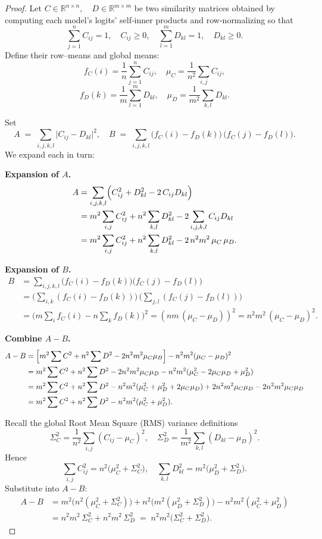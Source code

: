 \documentclass{article}
\begin{document}
\begin{proof}
Let 
$C\in\mathbb{R}^{n\times n},\quad D\in\mathbb{R}^{m\times m}$
be two similarity matrices obtained by computing each model’s logits’ self‐inner products and row‐normalizing so that
\[
\sum_{j=1}^n C_{ij}=1,\quad C_{ij}\ge0,
\quad
\sum_{l=1}^m D_{kl}=1,\quad D_{kl}\ge0.
\]
Define their row–means and global means:
\[
f_C(i)=\frac1n\sum_{j=1}^nC_{ij},\quad
\mu_C=\frac1{n^2}\sum_{i,j}C_{ij},
\]
\[
f_D(k)=\frac1m\sum_{l=1}^mD_{kl},\quad
\mu_D=\frac1{m^2}\sum_{k,l}D_{kl}.
\]

Set
\[
A \;=\;\sum_{i,j,k,l}\bigl|C_{ij}-D_{kl}\bigr|^2,
\quad
B \;=\;\sum_{i,j,k,l}\bigl(f_C(i)-f_D(k)\bigr)\,\bigl(f_C(j)-f_D(l)\bigr).
\]
We expand each in turn:

\textbf{Expansion of \(A\).}
\[
\begin{aligned}
A
&=\sum_{i,j,k,l}\Bigl(C_{ij}^2 + D_{kl}^2 -2\,C_{ij}D_{kl}\Bigr)\\
&=m^2\sum_{i,j}C_{ij}^2
+ n^2\sum_{k,l}D_{kl}^2
-2\sum_{i,j,k,l}C_{ij}D_{kl}\\
&=m^2\sum_{i,j}C_{ij}^2
+ n^2\sum_{k,l}D_{kl}^2
-2\,n^2m^2\,\mu_C\,\mu_D.
\end{aligned}
\]

\textbf{Expansion of \(B\).}
\[
\begin{aligned}
B
&=\sum_{i,j,k,l}\bigl(f_C(i)-f_D(k)\bigr)\bigl(f_C(j)-f_D(l)\bigr)\\
&=\bigl(\sum_{i,k}(f_C(i)-f_D(k))\bigr)\,\bigl(\sum_{j,l}(f_C(j)-f_D(l))\bigr)\\
&=\bigl(m\sum_i f_C(i) - n\sum_k f_D(k)\bigr)^2
=(nm\,(\mu_C-\mu_D))^2
=n^2m^2\,(\mu_C-\mu_D)^2.
\end{aligned}
\]

\textbf{Combine \(A-B\).}
\[
\begin{aligned}
A - B
&=\Bigl[m^2\sum C^2 + n^2\sum D^2 -2n^2m^2\mu_C\mu_D\Bigr]
  -n^2m^2(\mu_C-\mu_D)^2\\
&=m^2\sum C^2 + n^2\sum D^2
  -2n^2m^2\mu_C\mu_D
  -n^2m^2(\mu_C^2 -2\mu_C\mu_D + \mu_D^2)\\
&=m^2\sum C^2 + n^2\sum D^2
  -n^2m^2(\mu_C^2+\mu_D^2+2\mu_C\mu_D)
  +2n^2m^2\mu_C\mu_D
  -2n^2m^2\mu_C\mu_D\\
&=m^2\sum C^2 + n^2\sum D^2
  -n^2m^2(\mu_C^2+\mu_D^2).
\end{aligned}
\]

Recall the global Root Mean Square (RMS) variance definitions
\[
\Sigma_C^2
=\frac1{n^2}\sum_{i,j}(C_{ij}-\mu_C)^2,
\quad
\Sigma_D^2
=\frac1{m^2}\sum_{k,l}(D_{kl}-\mu_D)^2.
\]
Hence
\[
\sum_{i,j}C_{ij}^2
=n^2\bigl(\mu_C^2+\Sigma_C^2\bigr),
\quad
\sum_{k,l}D_{kl}^2
=m^2\bigl(\mu_D^2+\Sigma_D^2\bigr).
\]
Substitute into \(A-B\):
\[
\begin{aligned}
A - B
&=m^2\bigl(n^2(\mu_C^2+\Sigma_C^2)\bigr)
 +n^2\bigl(m^2(\mu_D^2+\Sigma_D^2)\bigr)
 -n^2m^2(\mu_C^2+\mu_D^2)\\
&=n^2m^2\,\Sigma_C^2 + n^2m^2\,\Sigma_D^2
\;=\;
n^2m^2\bigl(\Sigma_C^2+\Sigma_D^2\bigr).
\end{aligned}
\]



\end{proof}
\end{document}

